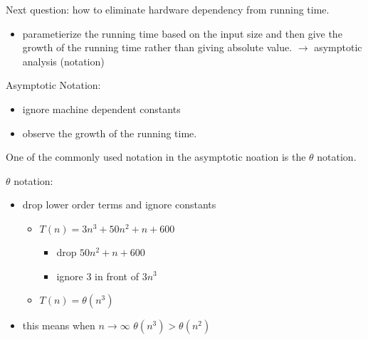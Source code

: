 \documentclass{article}
\begin{document}
    Next question: how to eliminate hardware dependency from running time.
    \begin{itemize}
        \item parametierize the running time based on the input size and then give the 
        growth of the running time rather than giving absolute value. $\rightarrow$ 
        asymptotic analysis (notation)
    \end{itemize}

    Asymptotic Notation:
    \begin{itemize}
        \item ignore machine dependent constants
        \item observe the growth of the running time.
    \end{itemize}
    One of the commonly used notation in the asymptotic noation is the $\theta$ notation.

    $\theta$ notation:
    \begin{itemize}
        \item drop lower order terms and ignore constants 
        \begin{itemize}
            \item $T(n) = 3n^3+50n^2+n+600$
            \begin{itemize}
                \item drop $50n^2+n+600$
                \item ignore $3$ in front of $3n^3$
            \end{itemize}
            \item $T(n)=\theta (n^3)$
        \end{itemize}
        \item this means when $n\rightarrow\infty$ $\theta(n^3)>\theta(n^2)$
    \end{itemize}
\end{document}
